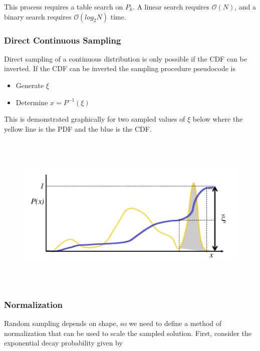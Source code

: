 \documentclass[12pt]{article}
\begin{document}
This process requires a table search on $P_k$. 
A linear search requires $\mathcal{O}(N)$, and a binary search requires $\mathcal{O}(log_2N)$ time.


\subsubsection*{Direct Continuous Sampling}

Direct sampling of a continuous distribution is only possible if the CDF can be inverted.
If the CDF can be inverted the sampling procedure pseudocode is

\begin{itemize}
  \item Generate $\xi$
  \item Determine $x=P^{-1}(\xi)$
\end{itemize}

This is demonstrated graphically for two sampled values of $\xi$ below where the yellow line is the PDF and the blue is the CDF.

\begin{figure}
  \begin{center}
  	\includegraphics[height=3.0in,clip]{../figs/cont-cdf-on-pdf-grey.png}
  \end{center}
\end{figure} 


\subsubsection*{Normalization}

Random sampling depends on shape, so we need to define a method of normalization that can be used to scale the sampled solution.
First, consider the exponential decay probability given by
\end{document}
